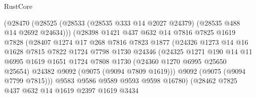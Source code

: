 \begin{lexlean}{RustCore}
\begin{coremodule}
                          (@28470
                            (@28525
                              (@28533
                                (@28535 @333 @14 @2027 @24379)
                                (@28535 @488 @14 @2692 @24634)))
                            (@28398
                              @1421
                              @437
                              @632
                              @14
                              @7816
                              @7825
                              @1619
                              @7828
                              (@28407
                                @1274
                                @17
                                @268
                                @7816
                                @7823
                                @1877
                                (@24326
                                  @1273
                                  @14
                                  @16
                                  @1628
                                  @7815
                                  @7822
                                  @1724
                                  @7798
                                  @1730
                                  @24346
                                  (@24325
                                    @1271
                                    @190
                                    @14
                                    @11
                                    @6995
                                    @1619
                                    @1651
                                    @1724
                                    @7808
                                    @1730
                                    (@24360 @1270 @6995 @25650 @25654)
                                    @24382
                                    @9092
                                    (@9075 (@9094 @7809 @1619)))
                                  @9092
                                  (@9075 (@9094 @7799 @7815)))
                                @9583
                                @9586
                                @9589
                                @9593
                                @9598
                                @16780)
                              (@28462
                                @7825
                                @437
                                @632
                                @14
                                @1619
                                @2397
                                @1619
                                @3434

\end{coremodule}
\end{lexlean}
